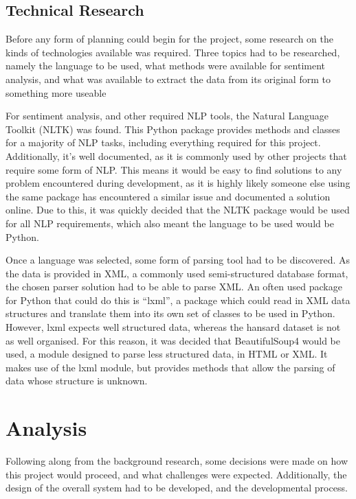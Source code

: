 \subsection{Technical Research}
Before any form of planning could begin for the project, some research on the kinds of technologies available was required. Three topics had to be researched, namely the language to be used, what methods were available for sentiment analysis, and what was available to extract the data from its original form to something more useable

For sentiment analysis, and other required NLP tools, the Natural Language Toolkit (NLTK)\cite{Bird2009} was found. This Python package provides methods and classes for a majority of NLP tasks, including everything required for this project. Additionally, it’s well documented, as it is commonly used by other projects that require some form of NLP. This means it would be easy to find solutions to any problem encountered during development, as it is highly likely someone else using the same package has encountered a similar issue and documented a solution online. Due to this, it was quickly decided that the NLTK package would be used for all NLP requirements, which also meant the language to be used would be Python.

Once a language was selected, some form of parsing tool had to be discovered. As the data is provided in XML, a commonly used semi-structured database format, the chosen parser solution had to be able to parse XML. An often used package for Python that could do this is “lxml”, a package which could read in XML data structures and translate them into its own set of classes to be used in Python. However, lxml expects well structured data, whereas the hansard dataset is not as well organised. For this reason, it was decided that BeautifulSoup4\cite{Richardson} would be used, a module designed to parse less structured data, in HTML or XML. It makes use of the lxml module, but provides methods that allow the parsing of data whose structure is unknown.

\section{Analysis}
Following along from the background research, some decisions were made on how this project would proceed, and what challenges were expected. Additionally, the design of the overall system had to be developed, and the developmental process.

